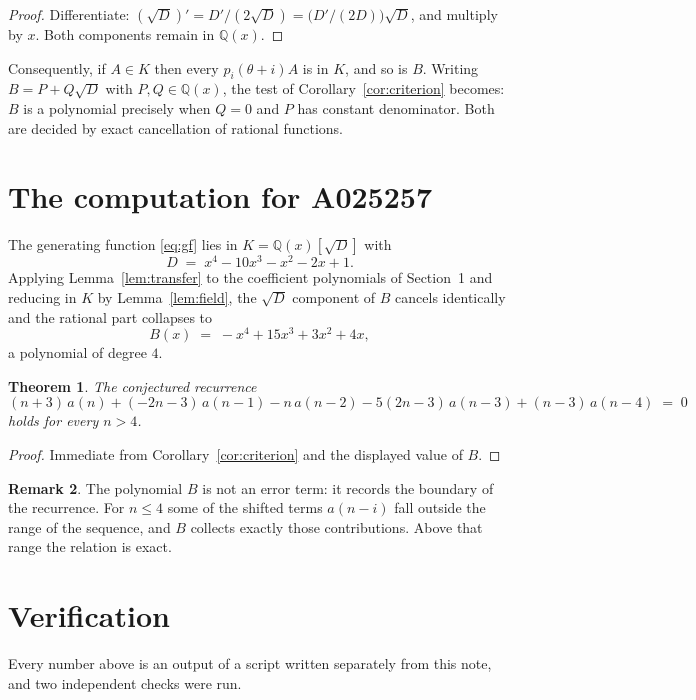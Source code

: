 \documentclass[11pt,a4paper]{article}
\theoremstyle{plain}
\newtheorem{theorem}{Theorem}
\theoremstyle{definition}
\newtheorem{remark}[theorem]{Remark}
\begin{document}
\begin{proof}
Differentiate: $(\sqrt{D})'=D'/(2\sqrt{D})=\bigl(D'/(2D)\bigr)\sqrt{D}$, and multiply by
$x$. Both components remain in $\mathbb{Q}(x)$.
\end{proof}

Consequently, if $A\in K$ then every $p_{i}(\theta+i)A$ is in $K$, and so is $B$. Writing
$B=P+Q\sqrt{D}$ with $P,Q\in\mathbb{Q}(x)$, the test of Corollary~\ref{cor:criterion}
becomes: $B$ is a polynomial precisely when $Q=0$ and $P$ has constant denominator. Both
are decided by exact cancellation of rational functions.

\section{The computation for A025257}

The generating function \eqref{eq:gf} lies in $K=\mathbb{Q}(x)[\sqrt{D}]$ with
\[
D \;=\; x^{4} - 10 x^{3} - x^{2} - 2 x + 1 .
\]
Applying Lemma~\ref{lem:transfer} to the coefficient polynomials of Section~1 and reducing
in $K$ by Lemma~\ref{lem:field}, the $\sqrt{D}$ component of $B$ cancels identically and
the rational part collapses to
\[
B(x)\;=\;- x^{4} + 15 x^{3} + 3 x^{2} + 4 x ,
\]
a polynomial of degree $4$.

\begin{theorem}
The conjectured recurrence
\[
(n + 3)\,a(n) + (- 2 n - 3)\,a(n-1) -  n\,a(n-2) -  5 \left(2 n - 3\right)\,a(n-3) + (n - 3)\,a(n-4) \;=\;0
\]
holds for every $n>4$.
\end{theorem}

\begin{proof}
Immediate from Corollary~\ref{cor:criterion} and the displayed value of $B$.
\end{proof}

\begin{remark}
The polynomial $B$ is not an error term: it records the boundary of the recurrence. For
$n\le4$ some of the shifted terms $a(n-i)$ fall outside the range of the sequence,
and $B$ collects exactly those contributions. Above that range the relation is exact.
\end{remark}

\section{Verification}

Every number above is an output of a script written separately from this note, and two
independent checks were run.
\end{document}
